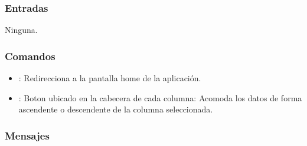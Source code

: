 \subsubsection{Entradas}
	\begin{Citemize}
		\item Ninguna. 
	\end{Citemize}

\subsubsection{Comandos}
\begin{itemize}
	\item {}: Redirecciona a la pantalla home de la aplicación.
	\item {}: Boton ubicado en la cabecera de cada columna: Acomoda los datos de forma ascendente o descendente de la columna seleccionada. 
\end{itemize}

\subsubsection{Mensajes}
	\begin{Citemize}
		\item {}
		\item {}
		\item {}
	\end{Citemize}